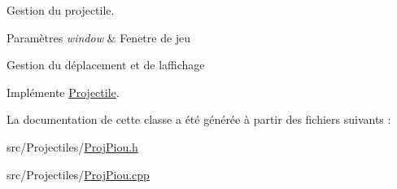 Gestion du projectile. 


\begin{DoxyParams}{Paramètres}
{\em window} & Fenetre de jeu\\
\hline
\end{DoxyParams}
Gestion du déplacement et de l\textquotesingle{}affichage 

Implémente \hyperlink{class_projectile_a09e02b793473660fc59a329a4dfea0ec}{Projectile}.



La documentation de cette classe a été générée à partir des fichiers suivants \+:\begin{DoxyCompactItemize}
\item 
src/\+Projectiles/\hyperlink{_proj_piou_8h}{Proj\+Piou.\+h}\item 
src/\+Projectiles/\hyperlink{_proj_piou_8cpp}{Proj\+Piou.\+cpp}\end{DoxyCompactItemize}
